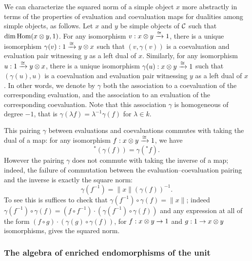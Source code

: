 \documentclass{amsart}
\begin{document}
We can characterize the squared norm of a simple object $x$ more abstractly in terms of the properties of evaluation and coevaluation maps for dualities among simple objects, as follows.  Let $x$ and $y$ be simple objects of $\mathcal C$ such that $\dim \operatorname{Hom}(x \otimes y,1)$.  For any isomorphism $v: x \otimes y \xrightarrow{\cong} 1$, there is a unique isomorphism $\gamma(v): 1 \xrightarrow{\cong} y \otimes x$ such that $(v,\gamma(v))$ is a coevaluation and evaluation pair witnessing $y$ as a left dual of $x$.  Similarly, for any isomorphism $u: 1 \xrightarrow{\cong} y \otimes x$, there is a unique isomorphism $\gamma(u): x \otimes y \xrightarrow{\cong} 1$ such that $(\gamma(u),u)$ is a coevaluation and evaluation pair witnessing $y$ as a left dual of $x$.  In other words, we denote by $\gamma$ both the association to a coevaluation of the corresponding evaluation, and the association to an evaluation of the corresponding coevaluation.  Note that this association $\gamma$ is homogeneous of degree $-1$, that is $\gamma(\lambda f) = \lambda^{-1} \gamma(f)$ for $\lambda \in k$.  

This pairing $\gamma$ between evaluations and coevaluations commutes with taking the dual of a map: for any isomorphism $f: x \otimes y \xrightarrow{\cong} 1$, we have
\[
{}^*(\gamma(f)) = \gamma({}^* f).
\]
However the pairing $\gamma$ does not commute with taking the inverse of a map; indeed, the failure of commutation between the evaluation--coevaluation pairing and the inverse is exactly the square norm:
\[
\gamma(f^{-1}) = \lVert x \rVert (\gamma(f))^{-1}.
\]
To see this is suffices to check that $\gamma(f^{-1}) \circ \gamma(f) = \lVert x \rVert$; indeed $\gamma(f^{-1}) \circ \gamma(f) = (f \circ f^{-1}) \cdot (\gamma(f^{-1}) \circ \gamma(f))$ and any expression at all of the form $(f \circ g) \cdot (\gamma(g) \circ \gamma(f))$, for $f: x \otimes y \rightarrow 1$ and $g: 1 \rightarrow x \otimes y$ isomorphisms, gives the squared norm.


\subsubsection{The algebra of enriched endomorphisms of the unit} \label{sec:enrichedendo}
\end{document}
